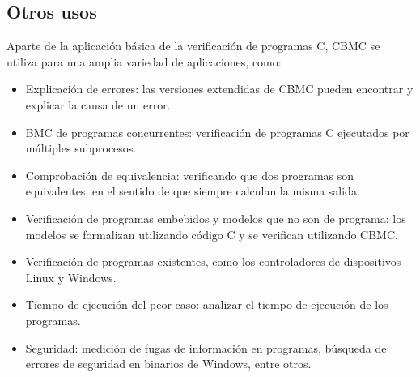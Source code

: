 \documentclass{llncs}
\begin{document}
    \subsection{Otros usos}
        Aparte de la aplicación básica de la verificación de programas C, CBMC
        se utiliza para una amplia variedad de aplicaciones, como:
        \begin{itemize}
            \item Explicación de errores: las versiones extendidas de CBMC
                pueden encontrar y explicar la causa de un error.
            \item BMC de programas concurrentes: verificación de programas C
                ejecutados por múltiples subprocesos.
            \item Comprobación de equivalencia: verificando que dos programas
                son equivalentes, en el sentido de que siempre calculan la misma
                salida.
            \item Verificación de programas embebidos y modelos que no son de
                programa: los modelos se formalizan utilizando código C y se
                verifican utilizando CBMC.
            \item Verificación de programas existentes, como los controladores
                de dispositivos Linux y Windows.
            \item Tiempo de ejecución del peor caso: analizar el tiempo de
                ejecución de los programas.
            \item Seguridad: medición de fugas de información en programas,
                búsqueda de errores de seguridad en binarios de Windows, entre
                otros.
        \end{itemize}

\end{document}
